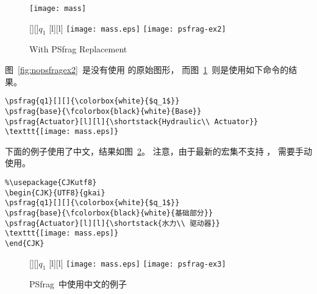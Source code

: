 \begin{figure}
\begin{minipage}[b]{.5\textwidth}
\centering
\texttt{[image: mass]}
\caption{Without PSfrag Replacement}\label{fig:nopsfragex2}
\par\vspace{0pt}
\end{minipage}%
\begin{minipage}[b]{.5\textwidth}
\centering
\ifdvips
{}[][]{\colorbox{white}{$q_1$}}
[l][l]{}
\texttt{[image: mass.eps]}
\else
\texttt{[image: psfrag-ex2]}
\fi
\caption{With PSfrag Replacement}\label{fig:psfragex2}
\par\vspace{0pt}
\end{minipage}
\end{figure}

图~\ref{fig:nopsfragex2}~是没有使用  的原始图形，
而图~\ref{fig:psfragex2}~则是使用如下命令的结果。
\begin{lstlisting}
\psfrag{q1}[][]{\colorbox{white}{$q_1$}}
\psfrag{base}{\fcolorbox{black}{white}{Base}}
\psfrag{Actuator}[l][l]{\shortstack{Hydraulic\\ Actuator}}
\texttt{[image: mass.eps]}
\end{lstlisting}

下面的例子使用了中文，结果如图~\ref{fig:psfragex3}。
注意，由于最新的宏集不支持 ，
需要手动使用。
\begin{lstlisting}
%\usepackage{CJKutf8}
\begin{CJK}{UTF8}{gkai}
\psfrag{q1}[][]{\colorbox{white}{$q_1$}}
\psfrag{base}{\fcolorbox{black}{white}{基础部分}}
\psfrag{Actuator}[l][l]{\shortstack{水力\\ 驱动器}}
\texttt{[image: mass.eps]}
\end{CJK}
\end{lstlisting}

\begin{figure}
\centering
\ifdvips
{}[][]{\colorbox{white}{$q_1$}}
[l][l]{}
\texttt{[image: mass.eps]}
\else
\texttt{[image: psfrag-ex3]}
\fi
\caption{PSfrag~{中使用中文的例子}}\label{fig:psfragex3}
\end{figure}

